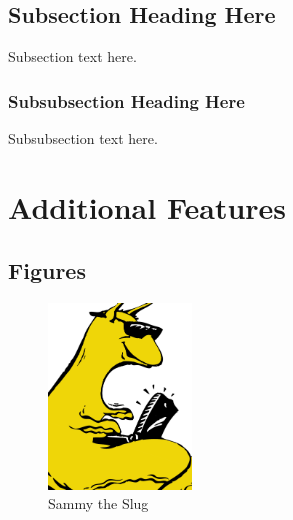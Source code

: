 \documentclass[12pt,journal,compsoc]{IEEEtran}
\begin{document}

\subsection{Subsection Heading Here}
Subsection text here.



\subsubsection{Subsubsection Heading Here}
Subsubsection text here.



\section{Additional Features}

\subsection{Figures}


\begin{figure}[h] 	%
\centering
\includegraphics[width=1.5in]{slug.pdf}
\caption{Sammy the Slug}
\label{fig_slug}
\end{figure}
\end{document}
